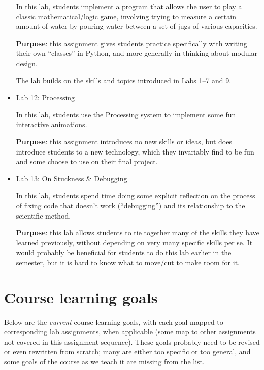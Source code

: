 \documentclass{article}
\begin{document}
\begin{itemize}
  In this lab, students implement a program that allows the user to
  play a classic mathematical/logic game, involving trying to measure
  a certain amount of water by pouring water between a set of jugs of
  various capacities.

  \textbf{Purpose}: this assignment gives students practice
  specifically with writing their own ``classes'' in Python, and more
  generally in thinking about modular design.

  The lab builds on the skills and topics introduced in Labs 1--7 and
  9.

\item Lab 12: Processing

  In this lab, students use the Processing system to implement some
  fun interactive animations.

  \textbf{Purpose}: this assignment introduces no new skills or ideas,
  but does introduce students to a new technology, which they
  invariably find to be fun and some choose to use on their final
  project.

\item Lab 13: On Stuckness \& Debugging

  In this lab, students spend time doing some explicit reflection on
  the process of fixing code that doesn't work (``debugging'') and its
  relationship to the scientific method.

  \textbf{Purpose}: this lab allows students to tie together many of
  the skills they have learned previously, without depending on very
  many specific skills per se.  It would probably be beneficial for
  students to do this lab earlier in the semester, but it is hard to
  know what to move/cut to make room for it.
\end{itemize}

\section*{Course learning goals}

Below are the \emph{current} course learning goals, with each goal
mapped to corresponding lab assignments, when applicable (some map to
other assignments not covered in this assignment sequence).  These
goals probably need to be revised or even rewritten from scratch; many
are either too specific or too general, and some goals of the course
as we teach it are missing from the list.
\end{document}
